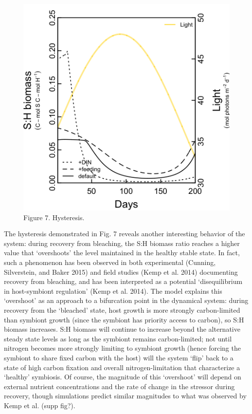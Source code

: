 \documentclass[]{elsarticle} %
\makeatletter
\def\maxwidth{\ifdim\Gin@nat@width>\linewidth\linewidth
\else\Gin@nat@width\fi}
\let\Oldincludegraphics\includegraphics
\renewcommand{\includegraphics}[1]{\Oldincludegraphics[width=\maxwidth]{#1}}
\makeatother
\begin{document}
\begin{figure}[htbp]
\centering
\includegraphics{../img/Fig7.png}
\caption{Figure 7. Hysteresis.}
\end{figure}

The hysteresis demonstrated in Fig. 7 reveals another interesting
behavior of the system: during recovery from bleaching, the S:H biomass
ratio reaches a higher value that `overshoots' the level maintained in
the healthy stable state. In fact, such a phenomenon has been observed
in both experimental (Cunning, Silverstein, and Baker 2015) and field
studies (Kemp et al. 2014) documenting recovery from bleaching, and has
been interpreted as a potential `disequilibrium in host-symbiont
regulation' (Kemp et al. 2014). The model explains this `overshoot' as
an approach to a bifurcation point in the dynamical system: during
recovery from the `bleached' state, host growth is more strongly
carbon-limited than symbiont growth (since the symbiont has priority
access to carbon), so S:H biomass increases. S:H biomass will continue
to increase beyond the alternative steady state levels as long as the
symbiont remains carbon-limited; not until nitrogen becomes more
strongly limiting to symbiont growth (hence forcing the symbiont to
share fixed carbon with the host) will the system `flip' back to a state
of high carbon fixation and overall nitrogen-limitation that
characterize a `healthy' symbiosis. Of course, the magnitude of this
`overshoot' will depend on external nutrient concentrations and the rate
of change in the stressor during recovery, though simulations predict
similar magnitudes to what was observed by Kemp et al. (supp fig?).
\end{document}
